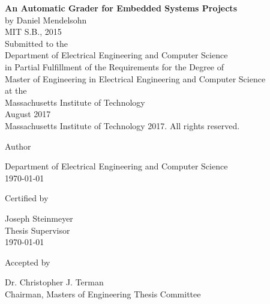\documentclass[12pt]{article}
\newcommand{\mytitle}{\textbf{An Automatic Grader for Embedded Systems Projects}}
\newcommand{\mydate}{\today}
\begin{document}
\begin{titlepage}

\centering
\mytitle \\
\vspace{12pt}
by Daniel Mendelsohn \\
MIT S.B., 2015 \\
\vspace{12pt}
Submitted to the \\
Department of Electrical Engineering and Computer Science \\
in Partial Fulfillment of the Requirements for the Degree of \\
\vspace{12pt}
Master of Engineering in Electrical Engineering and Computer Science \\
\vspace{12pt}
at the \\
\vspace{12pt}
Massachusetts Institute of Technology \\
\vspace{12pt}
August 2017 \\
\vspace{12pt}
\textcopyright \hspace{0.05in} Massachusetts Institute of Technology 2017.  All rights reserved. \\
\vspace{24pt}

Author \dotfill \\
\begin{flushright}
Department of Electrical Engineering and Computer Science \\
\mydate
\end{flushright}
\vspace{12pt}

Certified by \dotfill \\
\begin{flushright}
Joseph Steinmeyer \\
Thesis Supervisor \\
\mydate
\end{flushright}
\vspace{12pt}

Accepted by \dotfill \\
\begin{flushright}
Dr. Christopher J. Terman \\
Chairman, Masters of Engineering Thesis Committee
\end{flushright}

\end{titlepage}
\end{document}
